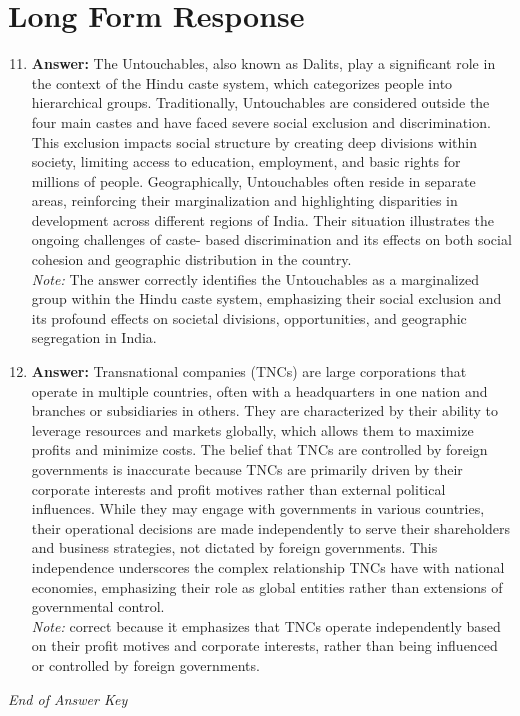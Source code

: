 \documentclass[12pt]{article}
\begin{document}
\section*{Long Form Response}
\begin{enumerate}[label=\arabic*.]
\setcounter{enumi}{10}
\item \textbf{Answer:} The Untouchables, also known as Dalits, play a significant role in the context of the Hindu caste system, which categorizes people into hierarchical groups. Traditionally, Untouchables are considered outside the four main castes and have faced severe social exclusion and discrimination. This exclusion impacts social structure by creating deep divisions within society, limiting access to education, employment, and basic rights for millions of people. Geographically, Untouchables often reside in separate areas, reinforcing their marginalization and highlighting disparities in development across different regions of India. Their situation illustrates the ongoing challenges of caste- based discrimination and its effects on both social cohesion and geographic distribution in the country.
\\ \textit{Note:} The answer correctly identifies the Untouchables as a marginalized group within the Hindu caste system, emphasizing their social exclusion and its profound effects on societal divisions, opportunities, and geographic segregation in India.
\item \textbf{Answer:} Transnational companies (TNCs) are large corporations that operate in multiple countries, often with a headquarters in one nation and branches or subsidiaries in others. They are characterized by their ability to leverage resources and markets globally, which allows them to maximize profits and minimize costs. The belief that TNCs are controlled by foreign governments is inaccurate because TNCs are primarily driven by their corporate interests and profit motives rather than external political influences. While they may engage with governments in various countries, their operational decisions are made independently to serve their shareholders and business strategies, not dictated by foreign governments. This independence underscores the complex relationship TNCs have with national economies, emphasizing their role as global entities rather than extensions of governmental control.
\\ \textit{Note:} correct because it emphasizes that TNCs operate independently based on their profit motives and corporate interests, rather than being influenced or controlled by foreign governments.
\end{enumerate}

\vfill
\noindent\textit{End of Answer Key}
\end{document}
